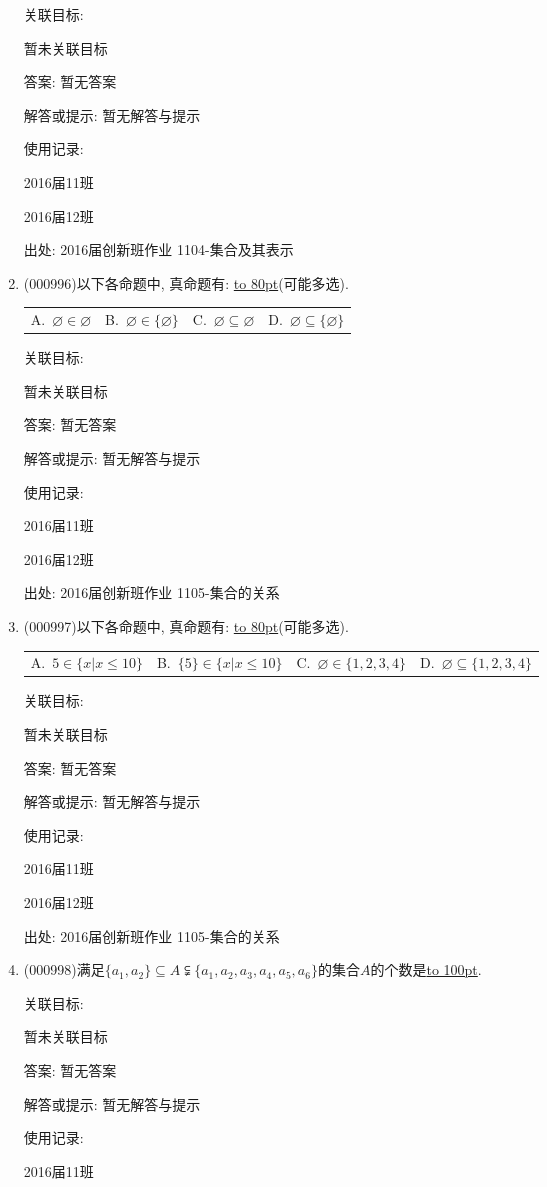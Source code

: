\documentclass[10pt,a4paper]{article}
\newcommand{\blank}[1]{\underline{\hbox to #1pt{}}}
\newcommand{\fourch}[4]{\par\begin{tabular}{p{.23\textwidth}p{.23\textwidth}p{.23\textwidth}p{.23\textwidth}}
A.~#1 &B.~#2& C.~#3& D.~#4
\end{tabular}}
\begin{document}
\begin{enumerate}[1.]
关联目标:

暂未关联目标

答案: 暂无答案

解答或提示: 暂无解答与提示

使用记录:

2016届11班	

2016届12班	


出处: 2016届创新班作业	1104-集合及其表示
\item { (000996)}以下各命题中, 真命题有: \blank{80}(可能多选).
\fourch{$\varnothing \in \varnothing$}{$\varnothing \in \{\varnothing\}$}{$\varnothing \subseteq \varnothing$}{$\varnothing \subseteq \{\varnothing\}$}


关联目标:

暂未关联目标

答案: 暂无答案

解答或提示: 暂无解答与提示

使用记录:

2016届11班	

2016届12班	


出处: 2016届创新班作业	1105-集合的关系
\item { (000997)}以下各命题中, 真命题有: \blank{80}(可能多选).
\fourch{$5\in \{x|x\le 10\}$}{$\{5\} \in \{x|x\le 10\}$}{$\varnothing \in \{1,2,3,4\}$}{$\varnothing \subseteq \{1,2,3,4\}$}


关联目标:

暂未关联目标

答案: 暂无答案

解答或提示: 暂无解答与提示

使用记录:

2016届11班	

2016届12班	


出处: 2016届创新班作业	1105-集合的关系
\item { (000998)}满足$\{a_1,a_2\}\subseteq A\subsetneqq\{a_1,a_2,a_3,a_4,a_5,a_6\}$的集合$A$的个数是\blank{100}.


关联目标:

暂未关联目标

答案: 暂无答案

解答或提示: 暂无解答与提示

使用记录:

2016届11班	


\end{enumerate}
\end{document}

